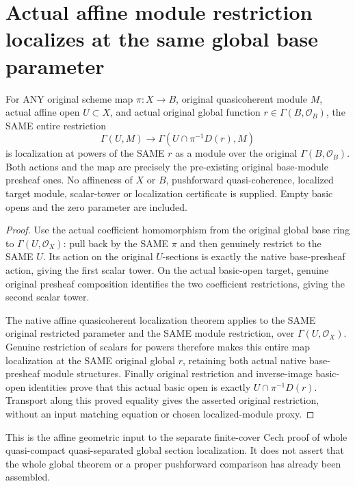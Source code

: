 \section{Actual affine module restriction localizes at the same global base parameter}
\label{sec:affine-open-global-parameter-localization}

\begin{theorem}
\label{sc0-affine-global-parameter:actual-restriction-localization}
\leanok
For ANY original scheme map $\pi:X\to B$, original quasicoherent
module $M$, actual affine open $U\subset X$, and actual original
global function $r\in\Gamma(B,\mathcal O_B)$, the SAME entire
restriction
\[
 \Gamma(U,M)\longrightarrow\Gamma(U\cap\pi^{-1}D(r),M)
\]
is localization at powers of the SAME $r$ as a module over the
original $\Gamma(B,\mathcal O_B)$. Both actions and the map are
precisely the pre-existing original base-module presheaf ones.
No affineness of $X$ or $B$, pushforward quasi-coherence, localized
target module, scalar-tower or localization certificate is supplied.
Empty basic opens and the zero parameter are included.
\end{theorem}
\begin{proof}
Use the actual coefficient homomorphism from the original global
base ring to $\Gamma(U,\mathcal O_X)$: pull back by the SAME
$\pi$ and then genuinely restrict to the SAME $U$. Its action
on the original $U$-sections is exactly the native base-presheaf
action, giving the first scalar tower. On the actual basic-open
target, genuine original presheaf composition identifies the two
coefficient restrictions, giving the second scalar tower.

The native affine quasicoherent localization theorem applies to
the SAME original restricted parameter and the SAME module
restriction, over $\Gamma(U,\mathcal O_X)$. Genuine restriction
of scalars for powers therefore makes this entire map localization
at the SAME original global $r$, retaining both actual native
base-presheaf module structures. Finally original restriction
and inverse-image basic-open identities prove that this actual
basic open is exactly $U\cap\pi^{-1}D(r)$. Transport along this
proved equality gives the asserted original restriction, without
an input matching equation or chosen localized-module proxy.
\end{proof}

This is the affine geometric input to the separate finite-cover
Cech proof of whole quasi-compact quasi-separated global section
localization. It does not assert that the whole global theorem
or a proper pushforward comparison has already been assembled.
